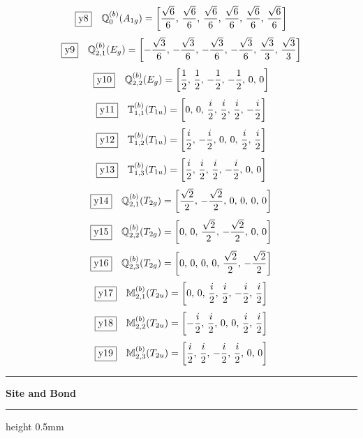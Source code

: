 \documentclass[fleqn,10pt,landscape]{jsarticle}
\begin{document}
\begin{dmath*}
\fbox{y8}\quad \mathbb{Q}_{0}^{(b)}(A_{1g})=\left[ \frac{\sqrt{6}}{6},\, \frac{\sqrt{6}}{6},\, \frac{\sqrt{6}}{6},\, \frac{\sqrt{6}}{6},\, \frac{\sqrt{6}}{6},\, \frac{\sqrt{6}}{6} \right]
\end{dmath*}
\begin{dmath*}
\fbox{y9}\quad \mathbb{Q}_{2,1}^{(b)}(E_{g})=\left[ - \frac{\sqrt{3}}{6},\, - \frac{\sqrt{3}}{6},\, - \frac{\sqrt{3}}{6},\, - \frac{\sqrt{3}}{6},\, \frac{\sqrt{3}}{3},\, \frac{\sqrt{3}}{3} \right]
\end{dmath*}
\begin{dmath*}
\fbox{y10}\quad \mathbb{Q}_{2,2}^{(b)}(E_{g})=\left[ \frac{1}{2},\, \frac{1}{2},\, - \frac{1}{2},\, - \frac{1}{2},\, 0,\, 0 \right]
\end{dmath*}
\begin{dmath*}
\fbox{y11}\quad \mathbb{T}_{1,1}^{(b)}(T_{1u})=\left[ 0,\, 0,\, \frac{i}{2},\, \frac{i}{2},\, \frac{i}{2},\, - \frac{i}{2} \right]
\end{dmath*}
\begin{dmath*}
\fbox{y12}\quad \mathbb{T}_{1,2}^{(b)}(T_{1u})=\left[ \frac{i}{2},\, - \frac{i}{2},\, 0,\, 0,\, \frac{i}{2},\, \frac{i}{2} \right]
\end{dmath*}
\begin{dmath*}
\fbox{y13}\quad \mathbb{T}_{1,3}^{(b)}(T_{1u})=\left[ \frac{i}{2},\, \frac{i}{2},\, \frac{i}{2},\, - \frac{i}{2},\, 0,\, 0 \right]
\end{dmath*}
\begin{dmath*}
\fbox{y14}\quad \mathbb{Q}_{2,1}^{(b)}(T_{2g})=\left[ \frac{\sqrt{2}}{2},\, - \frac{\sqrt{2}}{2},\, 0,\, 0,\, 0,\, 0 \right]
\end{dmath*}
\begin{dmath*}
\fbox{y15}\quad \mathbb{Q}_{2,2}^{(b)}(T_{2g})=\left[ 0,\, 0,\, \frac{\sqrt{2}}{2},\, - \frac{\sqrt{2}}{2},\, 0,\, 0 \right]
\end{dmath*}
\begin{dmath*}
\fbox{y16}\quad \mathbb{Q}_{2,3}^{(b)}(T_{2g})=\left[ 0,\, 0,\, 0,\, 0,\, \frac{\sqrt{2}}{2},\, - \frac{\sqrt{2}}{2} \right]
\end{dmath*}
\begin{dmath*}
\fbox{y17}\quad \mathbb{M}_{2,1}^{(b)}(T_{2u})=\left[ 0,\, 0,\, \frac{i}{2},\, \frac{i}{2},\, - \frac{i}{2},\, \frac{i}{2} \right]
\end{dmath*}
\begin{dmath*}
\fbox{y18}\quad \mathbb{M}_{2,2}^{(b)}(T_{2u})=\left[ - \frac{i}{2},\, \frac{i}{2},\, 0,\, 0,\, \frac{i}{2},\, \frac{i}{2} \right]
\end{dmath*}
\begin{dmath*}
\fbox{y19}\quad \mathbb{M}_{2,3}^{(b)}(T_{2u})=\left[ \frac{i}{2},\, \frac{i}{2},\, - \frac{i}{2},\, \frac{i}{2},\, 0,\, 0 \right]
\end{dmath*}
\vspace{5mm}
\noindent \rule[0.5mm]{5mm}{0.5mm}\hspace{3mm}\textbf{Site and Bond}\hspace{3mm}\leaders\hrule height 0.5mm\hfill\kern0pt
\vspace{3mm}
\end{document}
